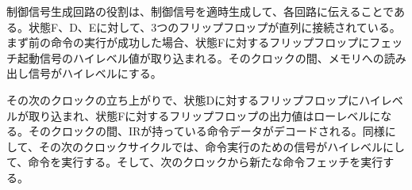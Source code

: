 \documentclass[submit,techrep]{ipsj}
\begin{document}
制御信号生成回路の役割は、制御信号を適時生成して、各回路に伝えることである。状態F、D、Eに対して、3つのフリップフロップが直列に接続されている。まず前の命令の実行が成功した場合、状態Fに対するフリップフロップにフェッチ起動信号のハイレベル値が取り込まれる。そのクロックの間、メモリへの読み出し信号がハイレベルにする。

その次のクロックの立ち上がりで、状態Dに対するフリップフロップにハイレベルが取り込まれ、状態Fに対するフリップフロップの出力値はローレベルになる。そのクロックの間、IRが持っている命令データがデコードされる。同様にして、その次のクロックサイクルでは、命令実行のための信号がハイレベルにして、命令を実行する。そして、次のクロックから新たな命令フェッチを実行する。








\end{document}
